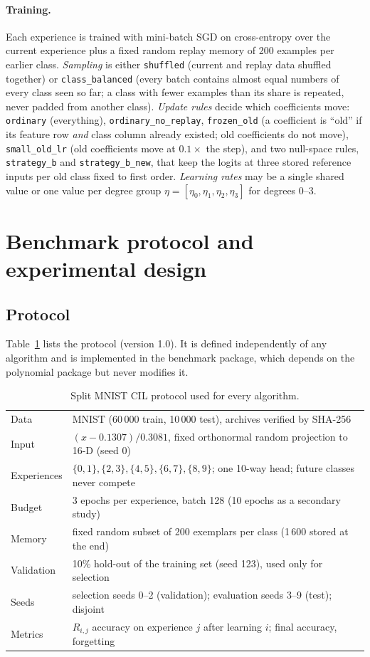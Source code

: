 \documentclass[11pt,a4paper]{article}
\begin{document}
\paragraph{Training.}
Each experience is trained with mini-batch SGD on cross-entropy over the current experience plus a fixed random replay memory of 200 examples per earlier class. \emph{Sampling} is either \texttt{shuffled} (current and replay data shuffled together) or \texttt{class\_balanced} (every batch contains almost equal numbers of every class seen so far; a class with fewer examples than its share is repeated, never padded from another class). \emph{Update rules} decide which coefficients move: \texttt{ordinary} (everything), \texttt{ordinary\_no\_replay}, \texttt{frozen\_old} (a coefficient is ``old'' if its feature row \emph{and} class column already existed; old coefficients do not move), \texttt{small\_old\_lr} (old coefficients move at $0.1\times$ the step), and two null-space rules, \texttt{strategy\_b} and \texttt{strategy\_b\_new}, that keep the logits at three stored reference inputs per old class fixed to first order. \emph{Learning rates} may be a single shared value or one value per degree group $\eta=[\eta_0,\eta_1,\eta_2,\eta_3]$ for degrees $0$--$3$.

\section{Benchmark protocol and experimental design}
\label{sec:protocol}
\subsection{Protocol}
Table~\ref{tab:protocol} lists the protocol (version 1.0). It is defined independently of any algorithm and is implemented in the benchmark package, which depends on the polynomial package but never modifies it.

\begin{table}[t]
\centering\small
\begin{tabular}{@{}ll@{}}
\toprule
Data & MNIST (60\,000 train, 10\,000 test), archives verified by SHA-256 \\
Input & $(x-0.1307)/0.3081$, fixed orthonormal random projection to 16-D (seed 0) \\
Experiences & $\{0,1\},\{2,3\},\{4,5\},\{6,7\},\{8,9\}$; one 10-way head; future classes never compete \\
Budget & 3 epochs per experience, batch 128 (10 epochs as a secondary study) \\
Memory & fixed random subset of 200 exemplars per class (1\,600 stored at the end) \\
Validation & 10\% hold-out of the training set (seed 123), used only for selection \\
Seeds & selection seeds 0--2 (validation); evaluation seeds 3--9 (test); disjoint \\
Metrics & $R_{i,j}$ accuracy on experience $j$ after learning $i$; final accuracy, forgetting \\
\bottomrule
\end{tabular}
\caption{Split MNIST CIL protocol used for every algorithm.}
\label{tab:protocol}
\end{table}
\end{document}
